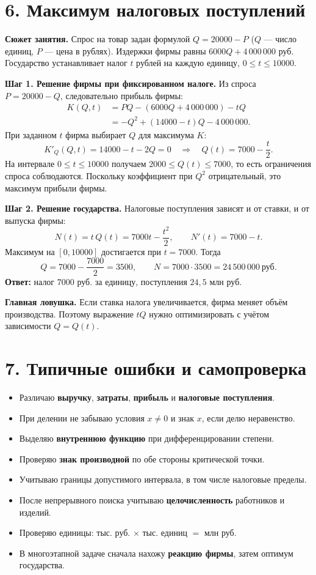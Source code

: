 \documentclass[a4paper,11pt]{article}
\newcommand{\topic}[1]{\Needspace{5\baselineskip}\section*{\color{darkaccent}#1}\vspace{-2mm}}
\newcommand{\key}[1]{\textcolor{darkaccent}{\textbf{#1}}}
\begin{document}
\topic{6. Максимум налоговых поступлений}
\key{Сюжет занятия.} Спрос на товар задан формулой $Q=20000-P$ ($Q$ — число единиц, $P$ — цена в рублях). Издержки фирмы равны $6000Q+4\,000\,000$ руб. Государство устанавливает налог $t$ рублей на каждую единицу, $0\le t\le10000$.

\textbf{Шаг 1. Решение фирмы при фиксированном налоге.}
Из спроса $P=20000-Q$, следовательно прибыль фирмы:
\begin{align*}
K(Q,t)&=PQ-(6000Q+4\,000\,000)-tQ\\
&=-Q^2+(14000-t)Q-4\,000\,000.
\end{align*}
При заданном $t$ фирма выбирает $Q$ для максимума $K$:
\[
K'_Q(Q,t)=14000-t-2Q=0
\quad\Longrightarrow\quad Q(t)=7000-\frac t2.
\]
На интервале $0\le t\le10000$ получаем $2000\le Q(t)\le7000$, то есть ограничения спроса соблюдаются. Поскольку коэффициент при $Q^2$ отрицательный, это максимум прибыли фирмы.

\textbf{Шаг 2. Решение государства.}
Налоговые поступления зависят и от ставки, и от выпуска фирмы:
\[
N(t)=t\,Q(t)=7000t-\frac{t^2}{2},
\qquad N'(t)=7000-t.
\]
Максимум на $[0,10000]$ достигается при $t=7000$. Тогда
\[
Q=7000-\frac{7000}{2}=3500,
\qquad N=7000\cdot3500=24\,500\,000\ \text{руб.}
\]
\key{Ответ:} налог $7000$ руб. за единицу, поступления $24{,}5$ млн руб.

\key{Главная ловушка.} Если ставка налога увеличивается, фирма меняет объём производства. Поэтому выражение $tQ$ нужно оптимизировать с учётом зависимости $Q=Q(t)$.

\topic{7. Типичные ошибки и самопроверка}
\begin{itemize}[label=$\square$]
\item Различаю \textbf{выручку}, \textbf{затраты}, \textbf{прибыль} и \textbf{налоговые поступления}.
\item При делении не забываю условия $x\ne0$ и знак $x$, если делю неравенство.
\item Выделяю \textbf{внутреннюю функцию} при дифференцировании степени.
\item Проверяю \textbf{знак производной} по обе стороны критической точки.
\item Учитываю границы допустимого интервала, в том числе налоговые пределы.
\item После непрерывного поиска учитываю \textbf{целочисленность} работников и изделий.
\item Проверяю единицы: тыс. руб. $\times$ тыс. единиц $=$ млн руб.
\item В многоэтапной задаче сначала нахожу \textbf{реакцию фирмы}, затем оптимум государства.
\end{itemize}
\clearpage
\end{document}
